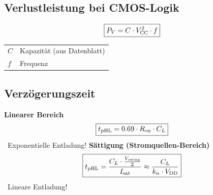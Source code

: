 \subsection{Verlustleistung bei CMOS-Logik}

\begin{minipage}[c]{0.38\columnwidth}
    $$ \boxed{ P_V = C \cdot V_{\rm CC}^2 \cdot f} $$
\end{minipage}
\hfill
\begin{minipage}[c]{0.58\columnwidth}
    \begin{tabular}{ll}
        $C$ & Kapazität (aus Datenblatt) \\
        $f$ & Frequenz 
    \end{tabular}
\end{minipage}


\subsection{Verzögerungszeit}

\begin{minipage}[t]{\columnwidth}
    \textbf{Linearer Bereich}
    $$ \boxed{t_{\rm pHL} = 0.69 \cdot R_{\rm on} \cdot C_L} $$
    \textrightarrow\ Exponentielle Entladung! 
    \textbf{Sättigung (Stromquellen-Bereich)}
    $$ \boxed{t_{\rm pHL} = \frac{C_L \cdot \frac{V_{\rm swing}}{2}}{I_{\rm sat}} \approx \frac{C_L}{k_n \cdot V_{\rm DD}} }$$
    \textrightarrow\ Lineare Entladung!
\end{minipage}


